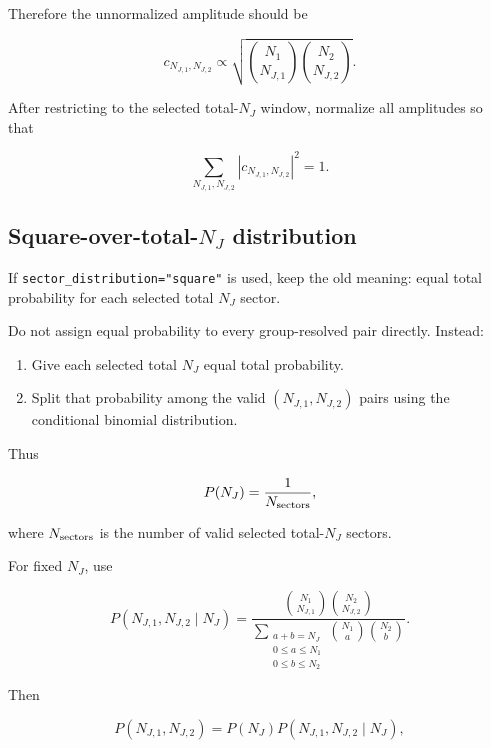 \documentclass[11pt]{article}
\begin{document}
Therefore the unnormalized amplitude should be

\begin{equation}
c_{N_{J,1},N_{J,2}}
\propto
\sqrt{
\binom{N_1}{N_{J,1}}
\binom{N_2}{N_{J,2}}
}.
\end{equation}

After restricting to the selected total-\(N_J\) window, normalize all amplitudes
so that

\begin{equation}
\sum_{N_{J,1},N_{J,2}}
|c_{N_{J,1},N_{J,2}}|^2
=1.
\end{equation}

\subsection*{Square-over-total-\(N_J\) distribution}

If \texttt{sector\_distribution="square"} is used, keep the old meaning: equal
total probability for each selected total \(N_J\) sector.

Do not assign equal probability to every group-resolved pair directly. Instead:

\begin{enumerate}
\item Give each selected total \(N_J\) equal total probability.
\item Split that probability among the valid \((N_{J,1},N_{J,2})\) pairs using
  the conditional binomial distribution.
\end{enumerate}

Thus

\begin{equation}
P(N_J)=\frac{1}{N_{\rm sectors}},
\end{equation}

where \(N_{\rm sectors}\) is the number of valid selected total-\(N_J\) sectors.

For fixed \(N_J\), use

\begin{equation}
P(N_{J,1},N_{J,2}\mid N_J)
=
\frac{
\binom{N_1}{N_{J,1}}
\binom{N_2}{N_{J,2}}
}{
\sum\limits_{\substack{a+b=N_J\\0\leq a\leq N_1\\0\leq b\leq N_2}}
\binom{N_1}{a}
\binom{N_2}{b}
}.
\end{equation}

Then

\begin{equation}
P(N_{J,1},N_{J,2})
=
P(N_J)
P(N_{J,1},N_{J,2}\mid N_J),
\end{equation}
\end{document}
